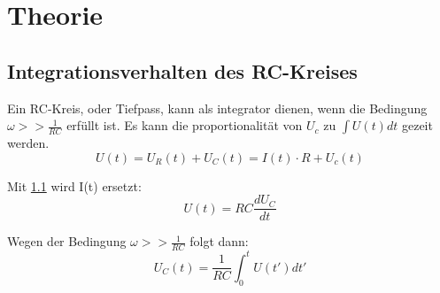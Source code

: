 \section{Theorie}
\label{sec:Theorie}



\subsection{Integrationsverhalten des RC-Kreises}
Ein RC-Kreis, oder Tiefpass, kann als integrator dienen, wenn die Bedingung $\omega >> \frac{1}{RC}$ erfüllt ist. Es kann die proportionalität von $U_c$ zu $\int U(t) dt$ gezeit werden.
\begin{equation}
    U(t) = U_{R}(t) + U_C(t) = I(t) \cdot R + U_c(t)
    \label{eq:e9} %
\end{equation}

Mit \ref{} wird I(t) ersetzt:\\

\begin{equation}
    U(t) = RC\frac{dU_C}{dt}
    \label{eq:e10} %
\end{equation}

Wegen der Bedingung $\omega >> \frac{1}{RC}$ folgt dann:
\begin{equation}
    U_C(t) = \frac{1}{RC}\int_{0}^{t}U(t') dt'
    \label{eq:e11} %
\end{equation}



\cite{sample}
